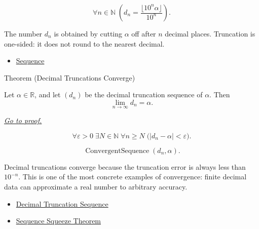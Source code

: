 \begin{remark*}
\[
\forall n\in\mathbb{N}\;
\left(
  d_n=\frac{\lfloor 10^n\alpha\rfloor}{10^n}
\right).
\]
\end{remark*}

\begin{remark*}[Interpretation]
The number $d_n$ is obtained by cutting $\alpha$ off after $n$ decimal
places. Truncation is one-sided: it does not round to the nearest decimal.
\end{remark*}

\begin{remark*}[Dependencies]\hfill
\begin{itemize}
  \item \hyperref[def:sequence]{Sequence}
\end{itemize}
\end{remark*}


\begin{theorembox}{Theorem (Decimal Truncations Converge)}
\begin{theorem}
\label{thm:decimal-truncations-converge}
Let $\alpha\in\mathbb{R}$, and let $(d_n)$ be the decimal truncation
sequence of $\alpha$. Then
\[
  \lim_{n\to\infty}d_n=\alpha.
\]

\smallskip
\noindent
\hyperref[prf:decimal-truncations-converge]{\textit{Go to proof.}}
\end{theorem}
\end{theorembox}

\begin{remark*}
\[
\forall \varepsilon>0\;\exists N\in\mathbb{N}\;\forall n\ge N
\;\bigl(|d_n-\alpha|<\varepsilon\bigr).
\]
\end{remark*}

\begin{remark*}
\[
\operatorname{ConvergentSequence}(d_n,\alpha).
\]
\end{remark*}

\begin{remark*}[Interpretation]
Decimal truncations converge because the truncation error is always less
than $10^{-n}$. This is one of the most concrete examples of convergence:
finite decimal data can approximate a real number to arbitrary accuracy.
\end{remark*}

\begin{remark*}[Dependencies]\hfill
\begin{itemize}
  \item \hyperref[def:decimal-truncation-sequence]{Decimal Truncation Sequence}
  \item \hyperref[thm:sequence-squeeze-theorem]{Sequence Squeeze Theorem}
\end{itemize}
\end{remark*}
